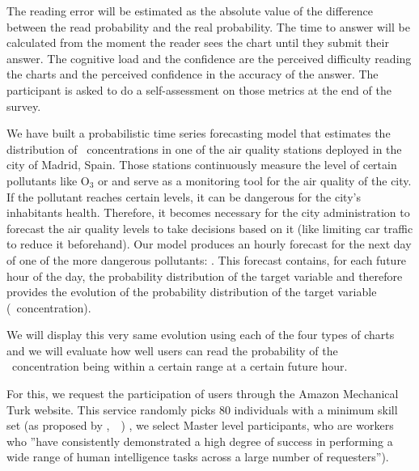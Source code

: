 \documentclass[a4paper,3p,sort&compress]{elsarticle}
\DeclareRobustCommand{\citeext}[1]{\citeauthor{#1},~\citeyear{#1}~\cite{#1}}
\begin{document}
The reading error will be estimated as the absolute value of the difference
between the read probability and the real probability. The time to answer will
be calculated from the moment the reader sees the chart until they submit their
answer. The cognitive load and the confidence are the perceived difficulty
reading the charts and the perceived confidence in the accuracy of the answer.
The participant is asked to do a self-assessment on those metrics at the end of
the survey.

We have built a probabilistic time series forecasting model that estimates the
distribution of \no~concentrations in one of the air quality stations deployed
in the city of Madrid, Spain. Those stations continuously measure the level of
certain pollutants like O$_{3}$ or \no and serve as a monitoring tool for the
air quality of the city. If the pollutant reaches certain levels, it can be
dangerous for the city's inhabitants health. Therefore, it becomes necessary for
the city administration to forecast the air quality levels to take decisions
based on it (like limiting car traffic to reduce it beforehand). Our model
produces an hourly forecast for the next day of one of the more dangerous
pollutants: \no. This forecast contains, for each future hour of the day, the
probability distribution of the target variable and therefore provides the
evolution of the probability distribution of the target variable
(\no~concentration).

We will display this very same evolution using each of the four types of charts
and we will evaluate how well users can read the probability of the
\no~concentration being within a certain range at a certain future hour.

For this, we request the participation of users through the Amazon Mechanical
Turk website. This service randomly picks 80 individuals with a minimum skill
set (as proposed by \citeext{brennen_instrument_2018}) , we select
Master level participants, who are workers who ''have consistently demonstrated
a high degree of success in performing a wide range of human intelligence tasks
across a large number of requesters'').
\end{document}

